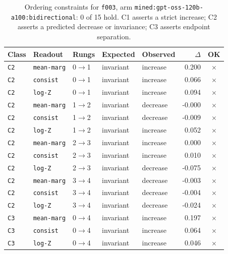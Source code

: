 \documentclass[11pt]{article}
\begin{document}
\begin{table}[htbp]
\centering
\small
\caption{Ordering constraints for \texttt{f003}, arm \texttt{mined:gpt-oss-120b-a100:bidirectional}: 0 of 15 hold. C1 asserts a strict increase; C2 asserts a predicted decrease or invariance; C3 asserts endpoint separation.}
\label{tab:ladder-f003-mined-gpt-oss-120b-a100-bidirectional}
\begin{tabular}{lllllrc}
\toprule
Class & Readout & Rungs & Expected & Observed & $\Delta$ & OK \\
\midrule
\texttt{C2} & \texttt{mean-marg} & 0$\to$1 & invariant & increase & 0.200 & $\times$ \\
\texttt{C2} & \texttt{consist} & 0$\to$1 & invariant & increase & 0.066 & $\times$ \\
\texttt{C2} & \texttt{log-Z} & 0$\to$1 & invariant & increase & 0.094 & $\times$ \\
\texttt{C2} & \texttt{mean-marg} & 1$\to$2 & invariant & decrease & -0.000 & $\times$ \\
\texttt{C2} & \texttt{consist} & 1$\to$2 & invariant & decrease & -0.009 & $\times$ \\
\texttt{C2} & \texttt{log-Z} & 1$\to$2 & invariant & increase & 0.052 & $\times$ \\
\texttt{C2} & \texttt{mean-marg} & 2$\to$3 & invariant & increase & 0.000 & $\times$ \\
\texttt{C2} & \texttt{consist} & 2$\to$3 & invariant & increase & 0.010 & $\times$ \\
\texttt{C2} & \texttt{log-Z} & 2$\to$3 & invariant & decrease & -0.075 & $\times$ \\
\texttt{C2} & \texttt{mean-marg} & 3$\to$4 & invariant & decrease & -0.003 & $\times$ \\
\texttt{C2} & \texttt{consist} & 3$\to$4 & invariant & decrease & -0.004 & $\times$ \\
\texttt{C2} & \texttt{log-Z} & 3$\to$4 & invariant & decrease & -0.024 & $\times$ \\
\texttt{C3} & \texttt{mean-marg} & 0$\to$4 & invariant & increase & 0.197 & $\times$ \\
\texttt{C3} & \texttt{consist} & 0$\to$4 & invariant & increase & 0.064 & $\times$ \\
\texttt{C3} & \texttt{log-Z} & 0$\to$4 & invariant & increase & 0.046 & $\times$ \\
\bottomrule
\end{tabular}
\end{table}
\end{document}
